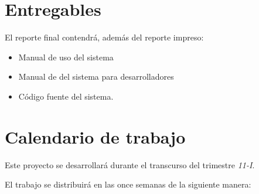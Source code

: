 \documentclass[11pt,letterpaper,titlepage]{article}
\begin{document}
\section{Entregables}

 El reporte final contendr\'a, adem\'as del reporte impreso:
\begin{itemize}
 \item Manual de uso del sistema
 \item Manual de del sistema para desarrolladores
\item C\'odigo fuente del sistema.
 
\end{itemize}





% 
% 



 

\section{Calendario de trabajo}
Este proyecto se desarrollar\'a durante el transcurso del trimestre \textit{11-I}.

El trabajo se distribuir\'a en las once semanas de la siguiente manera:
\end{document}
